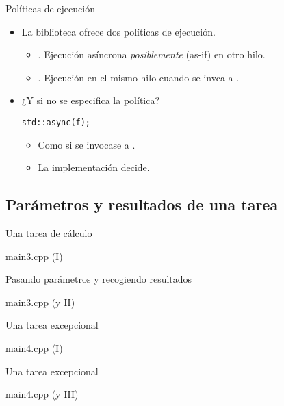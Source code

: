 \begin{frame}[t,fragile]{Políticas de ejecución}
\begin{itemize}
  \item La biblioteca ofrece dos políticas de ejecución.
    \begin{itemize}
      \item {}.
        Ejecución asíncrona \emph{posiblemente} (as-if) en otro hilo.
      \item {}.
        Ejecución en el mismo hilo cuando se invca a .
    \end{itemize}
  \pause
  \item ¿Y si no se especifica la política?
\begin{lstlisting}[basicstyle=\small\ttfamily]
std::async(f);
\end{lstlisting}
    \begin{itemize}
      \item Como si se invocase a  \cppkey{|} .
      \item La implementación decide.
    \end{itemize}
\end{itemize}
\end{frame}

\subsection{Parámetros y resultados de una tarea}

\begin{frame}[t]{Una tarea de cálculo}
\begin{block}{main3.cpp (I)}

\end{block}
\end{frame}

\begin{frame}[t]{Pasando parámetros y recogiendo resultados}
\begin{block}{main3.cpp (y II)}

\end{block}
\end{frame}

\begin{frame}[t]{Una tarea excepcional}
\begin{block}{main4.cpp (I)}

\end{block}
\end{frame}

\begin{frame}[t]{Una tarea excepcional}
\begin{block}{main4.cpp (y III)}

\end{block}
\end{frame}
